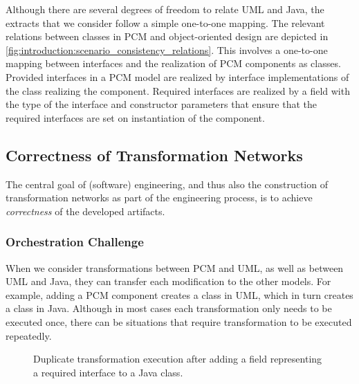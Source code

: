 Although there are several degrees of freedom to relate \gls{UML} and Java, the extracts that we consider follow a simple one-to-one mapping.
The relevant relations between classes in \gls{PCM} and object-oriented design are depicted in \autoref{fig:introduction:scenario_consistency_relations}.
This involves a one-to-one mapping between interfaces and the realization of \gls{PCM} components as classes. 
Provided interfaces in a \gls{PCM} model are realized by interface implementations of the class realizing the component. 
Required interfaces are realized by a field with the type of the interface and constructor parameters that ensure that the required interfaces are set on instantiation of the component.

\subsection{Correctness of Transformation Networks}

The central goal of (software) engineering, and thus also the construction of transformation networks as part of the engineering process, is to achieve \emph{correctness} of the developed artifacts.

\subsubsection*{Orchestration Challenge}
\label{chap:introduction:challenges:correctness:orchestration}

When we consider transformations between \gls{PCM} and \gls{UML}, as well as between \gls{UML} and Java, they can transfer each modification to the other models.
For example, adding a \gls{PCM} component creates a class in \gls{UML}, which in turn creates a class in Java.
Although in most cases each transformation only needs to be executed once, there can be situations that require transformation to be executed repeatedly.

\begin{figure}
    \centering
    
    \caption[Example for transformation orchestration]{Duplicate transformation execution after adding a field representing a required interface to a Java class.}
    \label{fig:introduction:scenario_duplicate_execution}
\end{figure}

